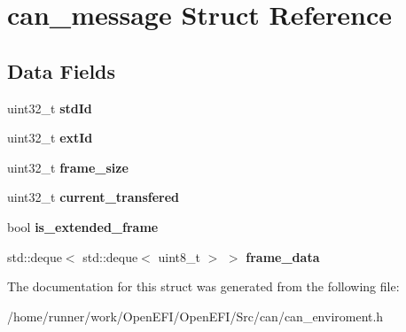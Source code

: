 \hypertarget{structcan__message}{}\section{can\+\_\+message Struct Reference}
\label{structcan__message}
\subsection*{Data Fields}
\begin{DoxyCompactItemize}
\item 
\mbox{\label{structcan__message_a7416d987f7d952b76951beee656df386}} 
uint32\+\_\+t {\bfseries std\+Id}
\item 
\mbox{\label{structcan__message_a2d2d397c506fbfbe69e8e871b6dcc4d1}} 
uint32\+\_\+t {\bfseries ext\+Id}
\item 
\mbox{\label{structcan__message_aaca6aec172e13b1b0c7b95b49970b353}} 
uint32\+\_\+t {\bfseries frame\+\_\+size}
\item 
\mbox{\label{structcan__message_a0c351a8848c67d852466b3f760c17fbb}} 
uint32\+\_\+t {\bfseries current\+\_\+transfered}
\item 
\mbox{\label{structcan__message_a8f90ff62332e1bc6b1ddba98da492b78}} 
bool {\bfseries is\+\_\+extended\+\_\+frame}
\item 
\mbox{\label{structcan__message_a050950555e4759bb988b73d4280306d6}} 
std\+::deque$<$ std\+::deque$<$ uint8\+\_\+t $>$ $>$ {\bfseries frame\+\_\+data}
\end{DoxyCompactItemize}


The documentation for this struct was generated from the following file\+:\begin{DoxyCompactItemize}
\item 
/home/runner/work/\+Open\+E\+F\+I/\+Open\+E\+F\+I/\+Src/can/can\+\_\+enviroment.\+h\end{DoxyCompactItemize}
